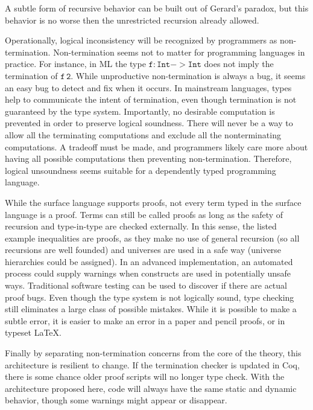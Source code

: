 A subtle form of recursive behavior can be built out of Gerard's paradox\cite{Reinhold89typecheckingis}, but this behavior is no worse then the unrestricted recursion already allowed.



Operationally, logical inconsistency will be recognized by programmers as non-termination.
Non-termination seems not to matter for programming languages in practice.
For instance, in ML the type $\mathtt{f:Int->Int}$ does not imply the termination of $\mathtt{f\,2}$.
While unproductive non-termination is always a bug, it seems an easy bug to detect and fix when it occurs.
In mainstream languages, types help to communicate the intent of termination, even though termination is not guaranteed by the type system.
Importantly, no desirable computation is prevented in order to preserve logical soundness.
There will never be a way to allow all the terminating computations and exclude all the nonterminating computations.
A tradeoff must be made, and programmers likely care more about having all possible computations then preventing non-termination.
Therefore, logical unsoundness seems suitable for a dependently typed programming language.



While the surface language supports proofs, not every term typed in the surface language is a proof.
Terms can still be called proofs as long as the safety of recursion and type-in-type are checked externally.
In this sense, the listed example inequalities are proofs, as they make no use of general recursion (so all recursions are well founded) and universes are used in a safe way (universe hierarchies could be assigned).
In an advanced implementation, an automated process could supply warnings when constructs are used in potentially unsafe ways.
Traditional software testing can be used to discover if there are actual proof bugs.
Even though the type system is not logically sound, type checking still eliminates a large class of possible mistakes.
While it is possible to make a subtle error, it is easier to make an error in a paper and pencil proofs, or in typeset \LaTeX .

Finally by separating non-termination concerns from the core of the theory, this architecture is resilient to change.
If the termination checker is updated in Coq, there is some chance older proof scripts will no longer type check.
With the architecture proposed here, code will always have the same static and dynamic behavior, though some warnings might appear or disappear.

